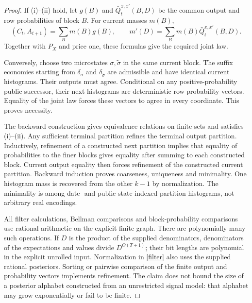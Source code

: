 \documentclass[11pt]{article}
\begin{document}
\begin{proof}
If (i)--(ii) hold, let $g(B)$ and $\bar Q_t^{x,x'}(B,D)$ be the common output and row probabilities of block $B$. For current masses $m(B)$,
\[
 (C_t,A_{t+1})=\sum_Bm(B)g(B),\qquad
 m'(D)=\sum_Bm(B)\bar Q_t^{x,x'}(B,D).
\]
Together with $P_X$ and price one, these formulas give the required joint law.

Conversely, choose two microstates $\sigma,\widetilde\sigma$ in the same current block. The suffix economies starting from $\delta_\sigma$ and $\delta_{\widetilde\sigma}$ are admissible and have identical current histograms. Their outputs must agree. Conditional on any positive-probability public successor, their next histograms are deterministic row-probability vectors. Equality of the joint law forces these vectors to agree in every coordinate. This proves necessity.

The backward construction gives equivalence relations on finite sets and satisfies (i)--(ii). Any sufficient terminal partition refines the terminal output partition. Inductively, refinement of a constructed next partition implies that equality of probabilities to the finer blocks gives equality after summing to each constructed block. Current output equality then forces refinement of the constructed current partition. Backward induction proves coarseness, uniqueness and minimality. One histogram mass is recovered from the other $k-1$ by normalization. The minimality is among date- and public-state-indexed partition histograms, not arbitrary real encodings.

All filter calculations, Bellman comparisons and block-probability comparisons use rational arithmetic on the explicit finite graph. There are polynomially many such operations. If $D$ is the product of the supplied denominators, denominators of the expectations and values divide $D^{O(T+1)}$; their bit lengths are polynomial in the explicit unrolled input. Normalization in \eqref{filter} also uses the supplied rational posteriors. Sorting or pairwise comparison of the finite output and probability vectors implements refinement. The claim does not bound the size of a posterior alphabet constructed from an unrestricted signal model: that alphabet may grow exponentially or fail to be finite.
\end{proof}
\end{document}
